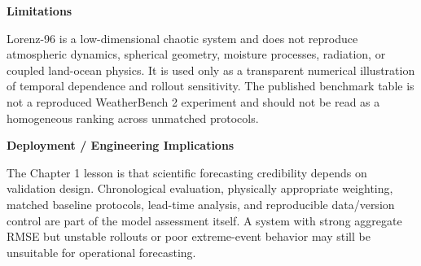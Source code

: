 \textbf{Limitations}

Lorenz-96 is a low-dimensional chaotic system and does not reproduce atmospheric dynamics, spherical geometry, moisture processes, radiation, or coupled land-ocean physics. It is used only as a transparent numerical illustration of temporal dependence and rollout sensitivity. The published benchmark table is not a reproduced WeatherBench 2 experiment and should not be read as a homogeneous ranking across unmatched protocols.

\textbf{Deployment / Engineering Implications}

The Chapter 1 lesson is that scientific forecasting credibility depends on validation design. Chronological evaluation, physically appropriate weighting, matched baseline protocols, lead-time analysis, and reproducible data/version control are part of the model assessment itself. A system with strong aggregate RMSE but unstable rollouts or poor extreme-event behavior may still be unsuitable for operational forecasting.
